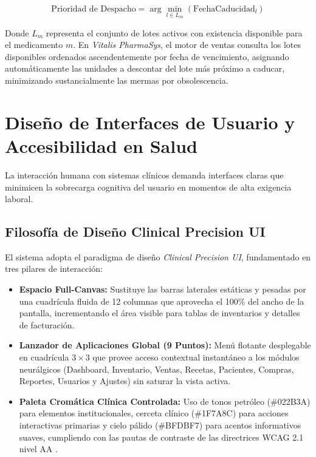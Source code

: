 \begin{equation}
    \text{Prioridad de Despacho} = \arg\min_{l \in L_{m}} (\text{FechaCaducidad}_{l})
    \label{eq:fefo}
\end{equation}

Donde $L_{m}$ representa el conjunto de lotes activos con existencia disponible para el medicamento $m$. En \textit{Vitalis PharmaSys}, el motor de ventas consulta los lotes disponibles ordenados ascendentemente por fecha de vencimiento, asignando automáticamente las unidades a descontar del lote más próximo a caducar, minimizando sustancialmente las mermas por obsolescencia.

\section{Diseño de Interfaces de Usuario y Accesibilidad en Salud}

La interacción humana con sistemas clínicos demanda interfaces claras que minimicen la sobrecarga cognitiva del usuario en momentos de alta exigencia laboral.

\subsection{Filosofía de Diseño Clinical Precision UI}
El sistema adopta el paradigma de diseño \textit{Clinical Precision UI}, fundamentado en tres pilares de interacción:
\begin{itemize}
    \item \textbf{Espacio Full-Canvas:} Sustituye las barras laterales estáticas y pesadas por una cuadrícula fluida de 12 columnas que aprovecha el 100\% del ancho de la pantalla, incrementando el área visible para tablas de inventarios y detalles de facturación.
    \item \textbf{Lanzador de Aplicaciones Global (9 Puntos):} Menú flotante desplegable en cuadrícula $3 \times 3$ que provee acceso contextual instantáneo a los módulos neurálgicos (Dashboard, Inventario, Ventas, Recetas, Pacientes, Compras, Reportes, Usuarios y Ajustes) sin saturar la vista activa.
    \item \textbf{Paleta Cromática Clínica Controlada:} Uso de tonos petróleo (\#022B3A) para elementos institucionales, cerceta clínico (\#1F7A8C) para acciones interactivas primarias y cielo pálido (\#BFDBF7) para acentos informativos suaves, cumpliendo con las pautas de contraste de las directrices WCAG 2.1 nivel AA \cite{w3c2018wcag}.
\end{itemize}

